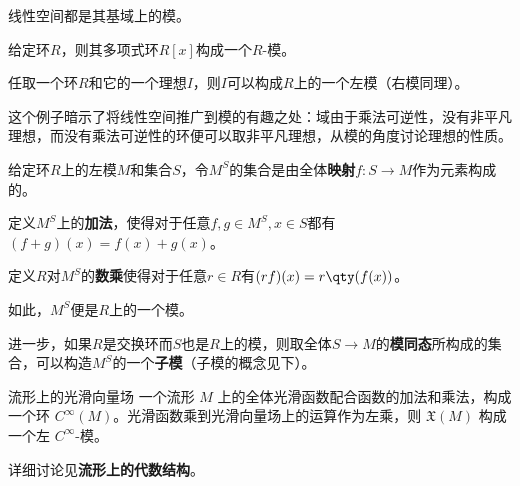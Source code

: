 \begin{example}{}
线性空间都是其基域上的模。
\end{example}

\begin{example}{}
给定环$R$，则其多项式环$R[x]$构成一个$R$-模。
\end{example}



\begin{example}{}

任取一个环$R$和它的一个理想$I$，则$I$可以构成$R$上的一个左模（右模同理）。

这个例子暗示了将线性空间推广到模的有趣之处：域由于乘法可逆性，没有非平凡理想，而没有乘法可逆性的环便可以取非平凡理想，从模的角度讨论理想的性质。

\end{example}


\begin{example}{}

给定环$R$上的左模$M$和集合$S$，令$M^S$的集合是由全体\textbf{映射}$f:S\to M$作为元素构成的。

定义$M^S$上的\textbf{加法}，使得对于任意$f, g\in \phantom{}M^S, x\in S$都有$(f+g)(x)=f(x)+g(x)$。

定义$R$对$M^S$的\textbf{数乘}使得对于任意$r\in R$有$(rf)(x)=r\qty(f(x))$。

如此，$M^S$便是$R$上的一个模。

进一步，如果$R$是交换环而$S$也是$R$上的模，则取全体$S\to M$的\textbf{模同态}所构成的集合，可以构造$M^S$的一个\textbf{子模}（子模的概念见下）。

\end{example}

\begin{example}{流形上的光滑向量场}
一个流形 $M$ 上的全体光滑函数配合函数的加法和乘法，构成一个环 $C^{\infty}(M)$。光滑函数乘到光滑向量场上的运算作为左乘，则 $\mathfrak{X}(M)$ 构成一个左 $C^{\infty}$-模。

详细讨论见\textbf{流形上的代数结构}。
\end{example}















